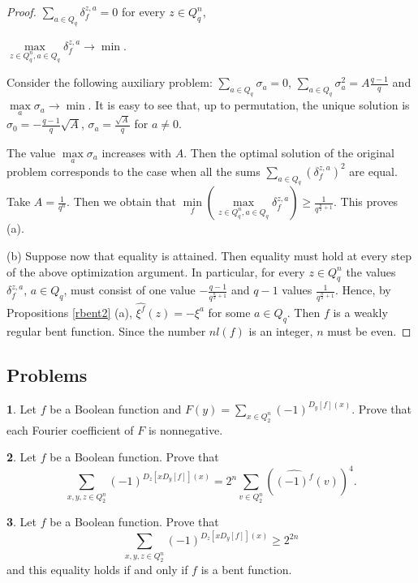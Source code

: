 \documentclass[11pt]{article}
\theoremstyle{definition}
\newtheorem{exercise}{\quad}
\begin{document}
{{{\begin{proof}
$\sum\limits_{a\in Q_q} \delta^{z,a}_f=0$ for every $z\in Q^n_q$,

$\max\limits_{z\in Q^n_q ,a\in Q_q}\delta^{z,a}_f\longrightarrow \min.$


Consider the following auxiliary problem: $\sum\limits_{a\in
Q_q}\sigma_{a}=0$, $\sum\limits_{a\in
Q_q}\sigma_{a}^2=A\frac{q-1}{q}$ and
$\max\limits_{a}\sigma_{a}\rightarrow \min.$ It is easy to see that, up to permutation, the unique solution  is $\sigma_0=-\frac{q-1}{q}\sqrt{A}$,
$\sigma_a=\frac{\sqrt{A}}{q}$ for $a\neq 0$.

The value $\max\limits_{a}\sigma_{a}$ increases with $A$. Then the optimal solution of the original problem
corresponds to the case when all the sums $\sum\limits_{a\in
Q_q}(\delta^{z,a}_f)^2$ are equal. Take $A=\frac{1}{q^n}$. Then
we obtain that  $\min\limits_f(\max\limits_{z\in Q^n_q,a\in
Q_q}\delta^{z,a}_f)\geq \frac{1}{q^{\frac{n}{2}+1}}$.
This proves  (a).

(b) Suppose now that equality is attained. Then equality must hold at every step of the above optimization argument. In particular, for every $z\in Q_q^n$ the values $\delta^{z,a}_f$, $a\in Q_q$,
 must consist of one value
$-\frac{q-1}{q^{\frac{n}{2}+1}}$  and $q-1$  values
$\frac{1}{q^{\frac{n}{2}+1}}$. Hence, by Propositions \ref{rbent2} (a),  $\widehat{\xi^f}(z)=-\xi^a$ for some $a\in Q_q$.
Then $f$ is a weakly regular bent function. Since the number
$nl(f)$ is an integer, $n$ must be even.
\end{proof}

\subsection{Problems}


\begin{exercise}
Let $f$ be a Boolean function and $F(y)=\sum\limits_{x\in Q^n_2}(-1)^{D_y[f](x)}$. Prove that each Fourier coefficient of $F$ is nonnegative. 
\end{exercise}

\begin{exercise}
Let $f$ be a Boolean function.  Prove that $$\sum\limits_{x,y,z\in Q^n_2}(-1)^{D_z[xD_y[f]](x)}=2^n\sum\limits_{v\in Q^n_2} 
(\widehat{(-1)^f}(v))^4.$$
\end{exercise}

\begin{exercise}
Let $f$ be a Boolean function.  Prove that  $$\sum\limits_{x,y,z\in Q^n_2}(-1)^{D_z[xD_y[f]](x)}\geq 2^{2n}$$ and this equality holds if and only if  $f$ is a bent function. 
\end{exercise}


}}}
\end{document}
